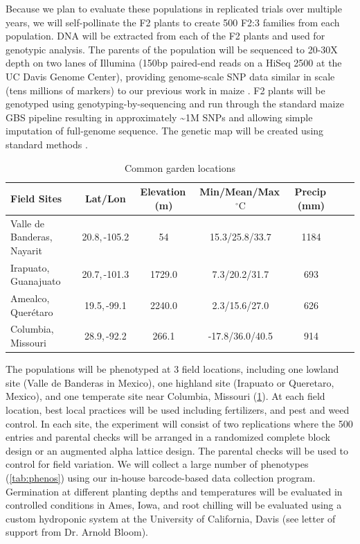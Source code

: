 Because we plan to evaluate these populations in replicated trials over multiple years, we will self-pollinate the F2 plants to create 500 F2:3 families from each population.  DNA will be extracted from each of the F2 plants and used for genotypic analysis.   The parents of the population will be sequenced to 20-30X depth on two lanes of Illumina (150bp paired-end reads on a HiSeq 2500 at the UC Davis Genome Center), providing genome-scale SNP data similar in scale (tens millions of markers) to our previous work in maize  \citep[HapMap.v2;][]{Chia2012a}.  F2 plants will be genotyped using genotyping-by-sequencing \citep[GBS;][]{Elshire2011} and run through the standard maize GBS pipeline \citep{Glaubitz2014} resulting in approximately \textasciitilde 1M SNPs and allowing simple imputation of full-genome sequence.  The genetic map will be created using standard methods \citep[e.g.][]{Broman2003a}. 

\begin{table}
\begin{center}
\caption{Common garden locations} \label{tab:locales}
\begin{tabular}{p{2cm}cccccc}\\\toprule  
{\bf Field Sites} & {\bf Lat/Lon } & {\bf Elevation\,(m) } &	{\bf Min/Mean/Max\,$^{\circ}\mathrm{C}$  } & {\bf Precip\,(mm) } \\ \toprule
Valle de Banderas, Nayarit	& 20.8,\,-105.2&	54		&	15.3/25.8/33.7	&	1184 \\
Irapuato, Guanajuato 	&	20.7,\,-101.3	&	1729.0	&	7.3/20.2/31.7	&	693 \\
Amealco, Quer\'etaro 	&	19.5,\,-99.1	&	2240.0 	&	2.3/15.6/27.0	&	626\\
Columbia, Missouri		& 	28.9,\,-92.2	&	266.1 	&	-17.8/36.0/40.5&	914\\ \bottomrule
\end{tabular}
\end{center}
\end{table} 

The populations will be phenotyped at 3 field locations, including one lowland site (Valle de Banderas in Mexico), one highland site (Irapuato or Queretaro, Mexico), and one temperate site near Columbia, Missouri (\ref{tab:locales}).  At each field location, best local practices will be used including fertilizers, and pest and weed control.
In each site, the experiment will consist of two replications where the 500 entries and parental checks will be arranged in a randomized complete block design or an augmented alpha lattice design. The parental checks will be used to control for field variation.  We will collect a large number of phenotypes (\ref{tab:phenos}) using our in-house barcode-based data collection program. Germination at different planting depths and temperatures will be evaluated in controlled conditions in Ames, Iowa, and root chilling will be evaluated using a custom hydroponic system at the University of California, Davis (see letter of support from Dr. Arnold Bloom).    

